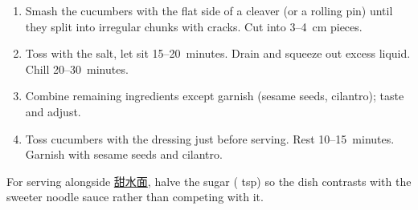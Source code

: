 
\begin{ingredients}
\end{ingredients}


\begin{recipe}
  \begin{enumerate}

  \item Smash the cucumbers with the flat side of a cleaver (or a
    rolling pin) until they split into irregular chunks with cracks.
    Cut into 3--4~cm pieces.

  \item Toss with the salt, let sit 15--20~minutes. Drain and squeeze
    out excess liquid. Chill 20--30~minutes.

  \item Combine remaining ingredients except garnish (sesame seeds,
    cilantro); taste and adjust.

  \item Toss cucumbers with the dressing just before serving. Rest
    10--15~minutes. Garnish with sesame seeds and cilantro.

  \end{enumerate}
\end{recipe}

\notes{} For serving alongside \hyperref[tian-shui-mian]{甜水面}, halve the sugar
(\fracQ{} tsp) so the dish contrasts with the sweeter noodle sauce
rather than competing with it.

